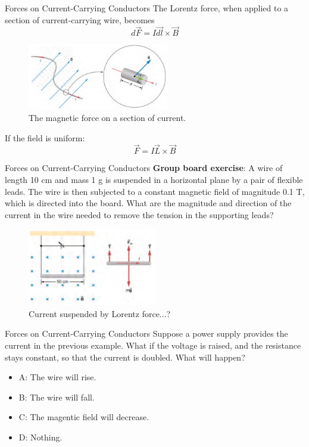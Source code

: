 \documentclass{beamer}
\begin{document}
\begin{frame}{Forces on Current-Carrying Conductors}
The Lorentz force, when applied to a section of current-carrying wire, becomes
\begin{equation}
d\vec{F} = I \vec{dl} \times \vec{B}
\end{equation}
\begin{figure}
\centering
\includegraphics[width=0.55\textwidth]{figures/current.png}
\caption{\label{fig:current} The magnetic force on a section of current.}
\end{figure}
If the field is uniform:
\begin{equation}
\vec{F} = I \vec{L} \times \vec{B}
\end{equation}
\end{frame}

\begin{frame}{Forces on Current-Carrying Conductors}
\small
\textbf{Group board exercise}: A wire of length 10 cm and mass 1 g is suspended in a horizontal plane by a pair of flexible leads.  The wire is then subjected to a constant magnetic field of magnitude 0.1 T, which is directed into the board.  What are the magnitude and direction of the current in the wire needed to remove the tension in the supporting leads?
\begin{figure}
\centering
\includegraphics[width=0.5\textwidth]{figures/leads.png}
\caption{\label{fig:leads} Current suspended by Lorentz force...?}
\end{figure}
\end{frame}

\begin{frame}{Forces on Current-Carrying Conductors}
Suppose a power supply provides the current in the previous example.  What if the voltage is raised, and the resistance stays constant, so that the current is doubled.  What will happen?
\begin{itemize}
\item A: The wire will rise.
\item B: The wire will fall.
\item C: The magentic field will decrease.
\item D: Nothing.
\end{itemize}
\end{frame}
\end{document}
